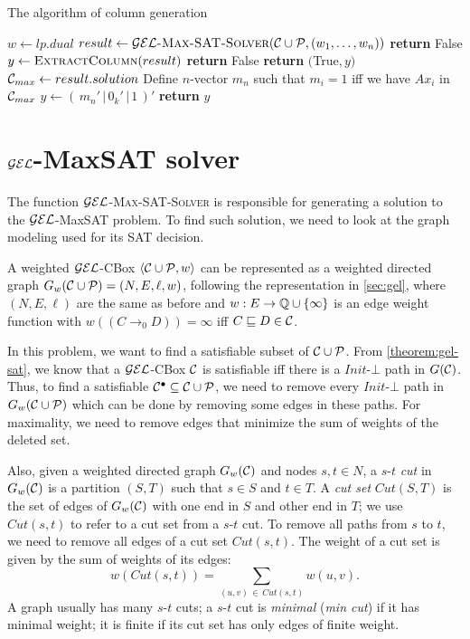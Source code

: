 \begin{algorithm}
	\caption{The algorithm of column generation}
	\label{alg:gen-col}
	\begin{algorithmic}[1]
		\State $w \gets lp.dual$
		\State $result \gets \Call{$\gel$-Max-SAT-Solver}{\CC \cup \PP, (w_1, \dots, w_n)}$
		\State \textbf{return} False
		\EndIf
		\Statex
		\State $y \gets \Call{ExtractColumn}{result}$
		\State \textbf{return} False
		\EndIf
		\Statex
		\State \textbf{return} $($True$, y)$
		\EndFunction
		\Statex
		\State $\mathcal{C}_{max} \gets result.solution$
		\State Define $n$-vector $m_n$ such that $m_i = 1$ iff we have $Ax_i$ in $\mathcal{C}_{max}$
		\State $y \gets (\, m_n' \, | \, 0_k' \, |\, 1 \,)'$
		\State \textbf{return} $y$
		\EndFunction
	\end{algorithmic}
\end{algorithm}


\section{\texorpdfstring{$\mathcal{GEL}$}{GEL}-MaxSAT solver}

The function $\mathcal{GEL}$\textsc{-Max-SAT-Solver} is responsible for generating a solution to the $\mathcal{GEL}$-MaxSAT problem. To find such solution, we need to look at the graph modeling used for its SAT decision.

A weighted $\mathcal{GEL}$-CBox $\langle\mathcal{C}\cup\mathcal{P}, w\rangle$ can be represented as a weighted directed graph $G_w(\mathcal{C}\cup\mathcal{P}) = (N, E, \ell, w)$, following the representation in \autoref{sec:gel}, where $(N, E, \ell)$ are the same as before and $w: E \to \mathbb{Q} \cup \{\infty\}$ is an edge weight function with $w\left(\left(C \to_0 D\right)\right) = \infty$ iff $C \sqsubseteq D \in \mathcal{C}$.

In this problem, we want to find a satisfiable subset of $\mathcal{C} \cup \mathcal{P}$. From \autoref{theorem:gel-sat}, we know that a $\mathcal{GEL}$-CBox $\mathcal{C}$ is satisfiable iff there is a $Init$-$\bot$ path in $G(\mathcal{C})$. Thus, to find a satisfiable $\mathcal{C}^\bullet \subseteq \mathcal{C} \cup \mathcal{P}$, we need to remove every $Init$-$\bot$ path in $G_w(\mathcal{C} \cup \mathcal{P})$ which can be done by removing some edges in these paths. For maximality, we need to remove edges that minimize the sum of weights of the deleted set.

Also, given a weighted directed graph $G_w(\mathcal{C})$ and nodes $s, t \in N$, a $s$-$t$ \emph{cut} in $G_w(\mathcal{C})$ is a partition $(S, T)$ such that $s \in S$ and $t \in T$. A \emph{cut set} $Cut(S, T)$ is the set of edges of $G_w(\mathcal{C})$ with one end in $S$ and other end in $T$; we use $Cut(s, t)$ to refer to a cut set from a $s$-$t$ cut.  To remove all paths from $s$ to $t$, we need to remove all edges of a cut set $Cut(s, t)$. The weight of a cut set is given by the sum of weights of its edges:
\[
	w(Cut(s, t)) = \sum_{(u, v) \, \in \, Cut(s, t)} w(u, v).	
\]
A graph usually has many $s$-$t$ cuts; a $s$-$t$ cut is \emph{minimal} (\emph{min cut}) if it has minimal weight; it is finite if its cut set has only edges of finite weight.

